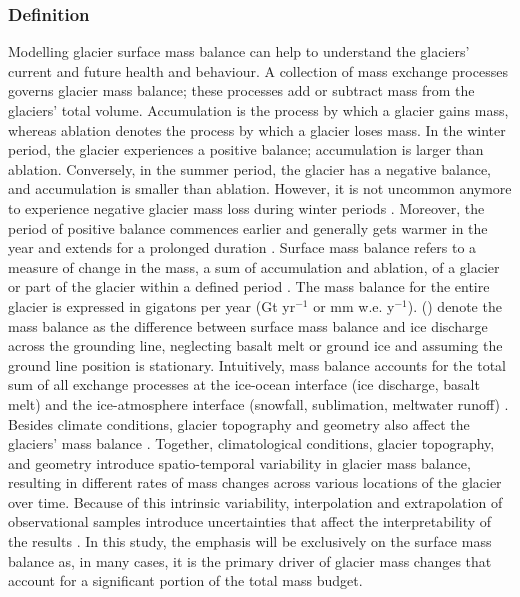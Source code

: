 \subsubsection{Definition}
Modelling glacier surface mass balance can help to understand the glaciers' current and future health and behaviour. A collection of mass exchange processes governs glacier mass balance; these processes add or subtract mass from the glaciers' total volume. Accumulation is the process by which a glacier gains mass, whereas ablation denotes the process by which a glacier loses mass. In the winter period, the glacier experiences a positive balance; accumulation is larger than ablation. Conversely, in the summer period, the glacier has a negative balance, and accumulation is smaller than ablation. However, it is not uncommon anymore to experience negative glacier mass loss during winter periods \cite{soheb-2020}. Moreover, the period of positive balance commences earlier and generally gets warmer in the year and extends for a prolonged duration \cite{thibert-2013}. Surface mass balance refers to a measure of change in the mass, a sum of accumulation and ablation, of a glacier or part of the glacier within a defined period \cite{cogley-2011}. The mass balance for the entire glacier is expressed in gigatons per year (Gt yr$^{-1}$ or mm w.e. y$^{-1}$). \citeauthor{van-den-broeke-2020} (\citeyear{van-den-broeke-2020}) denote the mass balance as the difference between surface mass balance and ice discharge across the grounding line, neglecting basalt melt or ground ice and assuming the ground line position is stationary. Intuitively, mass balance accounts for the total sum of all exchange processes at the ice-ocean interface (ice discharge, basalt melt) and the ice-atmosphere interface (snowfall, sublimation, meltwater runoff) \cite{van-den-broeke-2020}. Besides climate conditions, glacier topography and geometry also affect the glaciers' mass balance \cite{fujita-2008, florentine-2018, huss-2012}. Together, climatological conditions, glacier topography, and geometry introduce spatio-temporal variability in glacier mass balance, resulting in different rates of mass changes across various locations of the glacier over time. Because of this intrinsic variability, interpolation and extrapolation of observational samples introduce uncertainties that affect the interpretability of the results \cite{ahlstrm-2015}. In this study, the emphasis will be exclusively on the surface mass balance as, in many cases, it is the primary driver of glacier mass changes that account for a significant portion of the total mass budget.    

